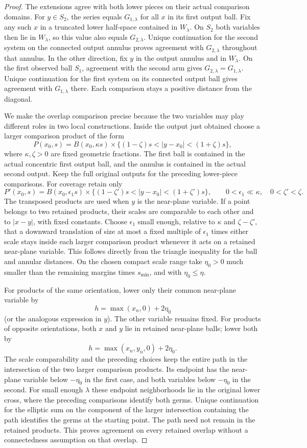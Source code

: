\begin{proof}
The extensions agree with both lower pieces on their actual comparison
domains.  For $y\in S_2$, the series equals $G_{1,\lambda}$ for all
$x$ in its first output ball.  Fix any such $x$ in a truncated lower
half-space contained in $W_\lambda$.  On $S_2$ both variables then lie
in $W_\lambda$, so this value also equals $G_{2,\lambda}$.  Unique
continuation for the second system on the connected output annulus
proves agreement with $G_{2,\lambda}$ throughout that annulus.  In the
other direction, fix $y$ in the output annulus and in $W_\lambda$.
On the first observed ball $S_1$, agreement with the second arm gives
$G_{2,\lambda}=G_{1,\lambda}$.  Unique continuation for the first
system on its connected output ball gives agreement with
$G_{1,\lambda}$ there.  Each comparison stays a positive distance from
the diagonal.

We make the overlap comparison precise because the two variables may
play different roles in two local constructions.  Inside the output just
obtained choose a larger comparison product of the form
\[
 P(x_0,s)=B(x_0,\kappa s)\times
 \{(1-\zeta)s<|y-x_0|<(1+\zeta)s\},
\]
where $\kappa,\zeta>0$ are fixed geometric fractions.  The first ball
is contained in the actual concentric first output ball, and the annulus
is contained in the actual second output.  Keep the full original
outputs for the preceding lower-piece comparisons.  For coverage retain
only
\[
 P'(x_0,s)=B(x_0,\epsilon_1s)\times
 \{(1-\zeta')s<|y-x_0|<(1+\zeta')s\},
 \qquad 0<\epsilon_1\ll\kappa,\quad 0<\zeta'<\zeta.
\]
The transposed products are used when $y$ is the near-plane variable.
If a point belongs to two retained products, their scales are comparable
to each other and to $|x-y|$, with fixed constants.  Choose $\epsilon_1$
small enough, relative to $\kappa$ and $\zeta-\zeta'$, that a downward
translation of size at most a fixed multiple of $\epsilon_1$ times
either scale stays inside each larger comparison product whenever it
acts on a retained near-plane variable.  This follows directly from
the triangle inequality for the ball and annular distances.  On the
chosen compact scale range take $\eta_0>0$ much smaller than the
remaining margins times $s_{\min}$, and with $\eta_0\le\eta$.

For products of the same orientation, lower only their common near-plane
variable by
\[
 h=\max(x_n,0)+2\eta_0
\]
(or the analogous expression in $y$).  The other variable remains
fixed.  For products of opposite orientations, both $x$ and $y$ lie
in retained near-plane balls; lower both by
\[
 h=\max(x_n,y_n,0)+2\eta_0.
\]
The scale comparability and the preceding choices keep the entire path
in the intersection of the two larger comparison products.  Its
endpoint has the near-plane variable below $-\eta_0$ in the first case,
and both variables below $-\eta_0$ in the second.  For small enough
$\lambda$ these endpoint neighborhoods lie in the original lower cross,
where the preceding comparisons identify both germs.  Unique
continuation for the elliptic sum on the component of the larger
intersection containing the path identifies the germs at the starting
point.  The path need not remain in the retained products.  This proves
agreement on every retained overlap without a connectedness assumption
on that overlap.


\end{proof}
